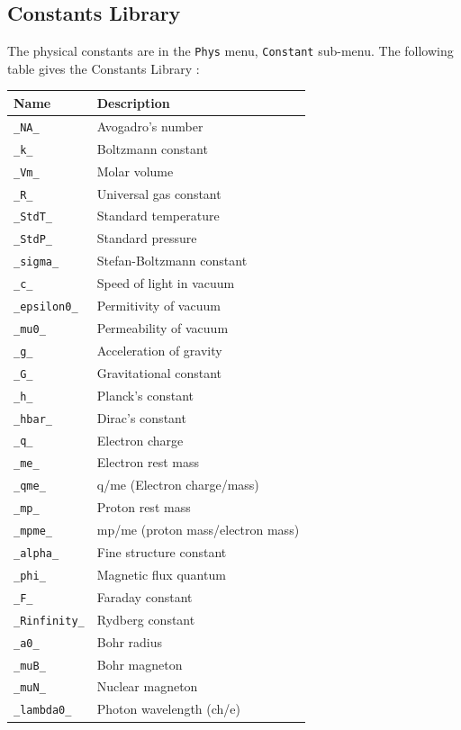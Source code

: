 \documentclass[a4paper,11pt]{book}
\begin{document}
\subsection{Constants Library}
The physical constants are in the {\tt Phys} menu, {\tt Constant}
sub-menu.
The following table gives the Constants Library  :
\begin{center}
\begin{tabular}{|l|l|}
\hline
Name & Description\\
\hline
{\tt \_NA\_} &Avogadro's number\\
{\tt \_k\_} &Boltzmann constant\\
{\tt \_Vm\_} &Molar volume\\
{\tt \_R\_} &Universal gas constant\\
{\tt \_StdT\_} &Standard temperature \\
{\tt \_StdP\_} &Standard pressure\\
{\tt \_sigma\_} &Stefan-Boltzmann constant\\
{\tt \_c\_} &Speed of light in vacuum\\
{\tt \_epsilon0\_} &Permitivity of vacuum\\
{\tt \_mu0\_} &Permeability of vacuum\\
{\tt \_g\_} &Acceleration of gravity\\
{\tt \_G\_} &Gravitational constant\\
{\tt \_h\_} &Planck's constant\\
{\tt \_hbar\_} &Dirac's constant\\
{\tt \_q\_} &Electron charge\\
{\tt \_me\_} &Electron rest mass\\
{\tt \_qme\_} &q/me (Electron charge/mass)\\
{\tt \_mp\_} &Proton rest mass\\
{\tt \_mpme\_} &mp/me (proton mass/electron mass)\\
{\tt \_alpha\_} &Fine structure constant\\
{\tt \_phi\_} &Magnetic flux quantum\\
{\tt \_F\_} & Faraday constant\\
{\tt \_Rinfinity\_} &Rydberg constant\\
{\tt \_a0\_} &Bohr radius\\
{\tt \_muB\_} &Bohr magneton\\
{\tt \_muN\_} &Nuclear magneton\\
{\tt \_lambda0\_} &Photon wavelength (ch/e)\\

\end{tabular}
\end{center}
\end{document}
